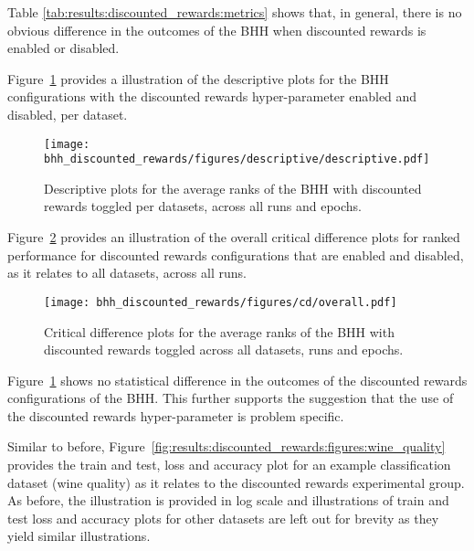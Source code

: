 Table \ref{tab:results:discounted_rewards:metrics} shows that, in general, there is no obvious difference in the outcomes of the \acs{BHH} when discounted rewards is enabled or disabled.

Figure~\ref{fig:results:discounted_rewards:descriptive:descriptive} provides a illustration of the descriptive plots for the \acs{BHH} configurations with the discounted rewards hyper-parameter enabled and disabled, per dataset.

\begin{figure}[H]
	\centering
	\texttt{[image: bhh\_discounted\_rewards/figures/descriptive/descriptive.pdf]}
	\caption{Descriptive plots for the average ranks of the \acs{BHH} with discounted rewards toggled per datasets, across all runs and epochs.}
	\label{fig:results:discounted_rewards:descriptive:descriptive}
\end{figure}

Figure~\ref{fig:results:discounted_rewards:descriptive:cd} provides an illustration of the overall critical difference plots for ranked performance for discounted rewards configurations that are enabled and disabled, as it relates to all datasets, across all runs.

\begin{figure}[H]
	\centering
	\texttt{[image: bhh\_discounted\_rewards/figures/cd/overall.pdf]}
	\caption{Critical difference plots for the average ranks of the \acs{BHH} with discounted rewards toggled across all datasets, runs and epochs.}
	\label{fig:results:discounted_rewards:descriptive:cd}
\end{figure}

Figure~\ref{fig:results:discounted_rewards:descriptive:descriptive} shows no statistical difference in the outcomes of the discounted rewards configurations of the \acs{BHH}. This further supports the suggestion that the use of the discounted rewards hyper-parameter is problem specific.

Similar to before, Figure~\ref{fig:results:discounted_rewards:figures:wine_quality} provides the train and test, loss and accuracy plot for an example classification dataset (wine quality) as it relates to the discounted rewards experimental group. As before, the illustration is provided in log scale and illustrations of train and test loss and accuracy plots for other datasets are left out for brevity as they yield similar illustrations.


